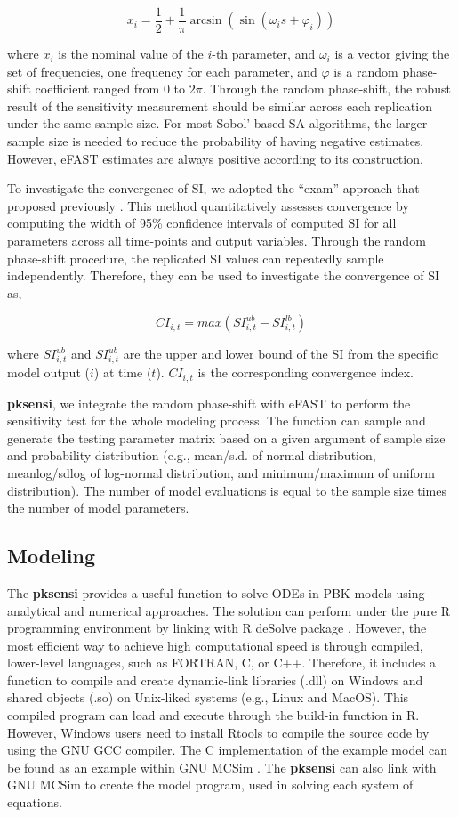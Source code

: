 \documentclass[preprint,12pt, a4paper]{elsarticle}
\begin{document}
\[ x_i = \frac{1}{2} + \frac{1}{\pi}\arcsin(\sin(\omega_is + \varphi_i)) \]

where \(x_i\) is the nominal value of the \(i\)-th parameter, and \(\omega_i\) is a vector giving the set of frequencies, one frequency for each parameter, and \(\varphi\) is a random phase-shift coefficient
ranged from 0 to \(2\pi\). Through the random phase-shift, the robust result of the sensitivity measurement should be similar across each replication under the same sample size. For most Sobol'-based SA algorithms, the larger sample size is needed to reduce the probability of having negative estimates. However, eFAST estimates are always positive according to its construction.

To investigate the convergence of SI, we adopted the ``exam'' approach that proposed previously \cite{sarrazin2016global}. This method quantitatively assesses convergence by computing the width of 95\% confidence intervals of computed SI for all parameters across all time-points and output variables. Through the random phase-shift procedure, the replicated SI values can repeatedly sample independently. Therefore, they can be used to investigate the convergence of SI as,

\[CI_{i,t} = max(SI_{i,t}^{ub}-SI_{i,t}^{lb})\]

where \(SI_{i,t}^{ub}\) and \(SI_{i,t}^{ub}\) are the upper and lower bound of the SI from the specific model output (\(i\)) at time (\(t\)). \(CI_{i,t}\) is the corresponding convergence index.

\textbf{pksensi}, we integrate the random phase-shift with eFAST to perform the sensitivity test for the whole modeling process. The function can sample and generate the testing parameter matrix based on a given argument of sample size and probability distribution (e.g., mean/s.d. of normal distribution, meanlog/sdlog of log-normal distribution, and minimum/maximum of uniform distribution). The number of model evaluations is equal to the sample size times the number of model parameters.


\subsection{Modeling}

The \textbf{pksensi} provides a useful function to solve ODEs in PBK models using analytical and numerical approaches. The solution can perform under the pure R programming environment by linking with R deSolve package \cite{JSSv033i09}. However, the most efficient way to achieve high computational speed is through compiled, lower-level languages, such as FORTRAN, C, or C++. Therefore, it includes a function to compile and create dynamic-link libraries (.dll) on Windows and shared objects (.so) on Unix-liked systems (e.g., Linux and MacOS). This compiled program can load and execute through the build-in function in R. However, Windows users need to install Rtools to compile the source code by using the GNU GCC compiler. The C implementation of the example model can be found as an example within GNU MCSim \cite{bois2009gnu}. The \textbf{pksensi} can also link with GNU MCSim to create the model program, used in solving each system of equations. 
\end{document}
